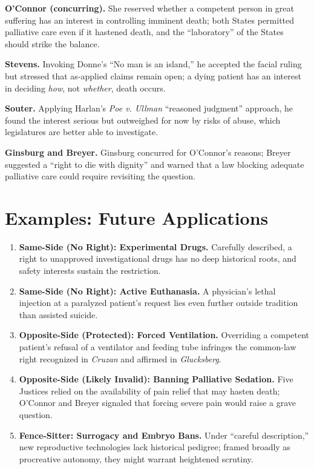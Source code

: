 \documentclass[12pt]{article}
\begin{document}
\textbf{O'Connor (concurring).} She reserved whether a competent person in great suffering has an interest in controlling imminent death; both States permitted palliative care even if it hastened death, and the ``laboratory'' of the States should strike the balance.

\textbf{Stevens.} Invoking Donne's ``No man is an island,'' he accepted the facial ruling but stressed that as-applied claims remain open; a dying patient has an interest in deciding \textit{how}, not \textit{whether}, death occurs.

\textbf{Souter.} Applying Harlan's \textit{Poe v. Ullman} ``reasoned judgment'' approach, he found the interest serious but outweighed for now by risks of abuse, which legislatures are better able to investigate.

\textbf{Ginsburg and Breyer.} Ginsburg concurred for O'Connor's reasons; Breyer suggested a ``right to die with dignity'' and warned that a law blocking adequate palliative care could require revisiting the question.

\section{Examples: Future Applications}

\begin{enumerate}
\item \textbf{Same-Side (No Right): Experimental Drugs.} Carefully described, a right to unapproved investigational drugs has no deep historical roots, and safety interests sustain the restriction.
\item \textbf{Same-Side (No Right): Active Euthanasia.} A physician's lethal injection at a paralyzed patient's request lies even further outside tradition than assisted suicide.
\item \textbf{Opposite-Side (Protected): Forced Ventilation.} Overriding a competent patient's refusal of a ventilator and feeding tube infringes the common-law right recognized in \textit{Cruzan} and affirmed in \textit{Glucksberg}.
\item \textbf{Opposite-Side (Likely Invalid): Banning Palliative Sedation.} Five Justices relied on the availability of pain relief that may hasten death; O'Connor and Breyer signaled that forcing severe pain would raise a grave question.
\item \textbf{Fence-Sitter: Surrogacy and Embryo Bans.} Under ``careful description,'' new reproductive technologies lack historical pedigree; framed broadly as procreative autonomy, they might warrant heightened scrutiny.
\end{enumerate}
\end{document}
